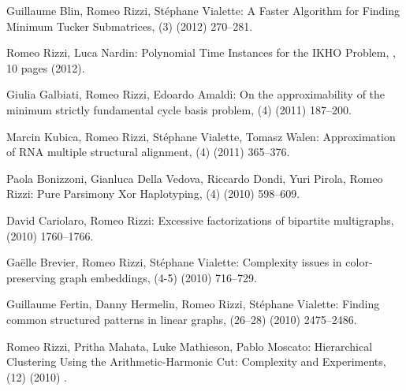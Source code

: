 \begin{etaremune}
  \item {\sc Guillaume Blin, Romeo Rizzi, St\'ephane Vialette:}
   \newblock  A Faster Algorithm for Finding Minimum Tucker Submatrices,
   (3) (2012) 270--281.

  \item {\sc Romeo Rizzi, Luca Nardin:}
   \newblock  Polynomial Time Instances for the IKHO Problem,
   , 10 pages (2012).

  \item {\sc Giulia Galbiati, Romeo Rizzi, Edoardo Amaldi:}
   \newblock  On the approximability of the minimum strictly fundamental cycle basis problem,
   (4) (2011) 187--200.

  \item {Marcin Kubica, Romeo Rizzi, St\'ephane Vialette, Tomasz Walen:}
   \newblock Approximation of RNA multiple structural alignment,
   (4) (2011) 365--376.

  \item {\sc Paola Bonizzoni, Gianluca Della Vedova, Riccardo Dondi, Yuri Pirola, Romeo Rizzi:}
   \newblock  Pure Parsimony Xor Haplotyping,
   (4) (2010) 598--609.

  \item {\sc David Cariolaro, Romeo Rizzi:}
   \newblock  Excessive factorizations of bipartite multigraphs,
    (2010) 1760--1766.

  \item {\sc Ga\"elle Brevier, Romeo Rizzi, St\'ephane Vialette:}
   \newblock   Complexity issues in color-preserving graph embeddings,
   (4-5) (2010) 716--729.

  \item {\sc Guillaume Fertin, Danny Hermelin, Romeo Rizzi, St\'ephane Vialette:}
   \newblock  Finding common structured patterns in linear graphs,
   (26--28) (2010) 2475--2486.

  \item {\sc Romeo Rizzi, Pritha Mahata, Luke Mathieson, Pablo Moscato:}
   \newblock  Hierarchical Clustering Using the Arithmetic-Harmonic Cut: Complexity and Experiments,
   (12) (2010) .


\end{etaremune}
